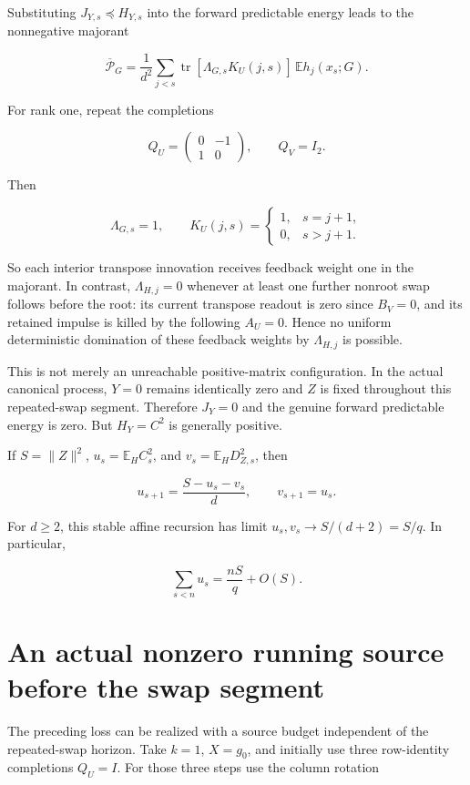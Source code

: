 \documentclass[11pt,oneside,openany,a4paper]{book}
\numberwithin{equation}{chapter}
\theoremstyle{definition}
\theoremstyle{remark}
\begin{document}
Substituting \(J_{Y,s}\preceq H_{Y,s}\) into the forward predictable energy leads to the nonnegative majorant

\[
\overline{\mathcal P}_G
=\frac1{d^2}\sum_{j<s}
\operatorname{tr}[\Lambda_{G,s}K_U(j,s)]\,
\mathbb E h_j(x_s;G).
\]

For rank one, repeat the completions

\[
Q_U=\begin{pmatrix}0&-1\\1&0\end{pmatrix},
\qquad Q_V=I_2.
\]

Then

\[
\Lambda_{G,s}=1,\qquad
K_U(j,s)=\begin{cases}1,&s=j+1,\\0,&s>j+1.\end{cases}
\]

So each interior transpose innovation receives feedback weight one in the majorant. In contrast, \(\Lambda_{H,j}=0\) whenever at least one further nonroot swap follows before the root: its current transpose readout is zero since \(B_V=0\), and its retained impulse is killed by the following \(A_U=0\). Hence no uniform deterministic domination of these feedback weights by \(\Lambda_{H,j}\) is possible.

This is not merely an unreachable positive-matrix configuration. In the actual canonical process, \(Y=0\) remains identically zero and \(Z\) is fixed throughout this repeated-swap segment. Therefore \(J_Y=0\) and the genuine forward predictable energy is zero. But \(H_Y=C^2\) is generally positive.

If \(S=\|Z\|^2\), \(u_s=\mathbb E_H C_s^2\), and \(v_s=\mathbb E_H D_{Z,s}^2\), then

\[
u_{s+1}=\frac{S-u_s-v_s}{d},\qquad v_{s+1}=u_s.
\]

For \(d\ge2\), this stable affine recursion has limit \(u_s,v_s\to S/(d+2)=S/q\). In particular,

\[
\sum_{s<n}u_s=\frac{nS}{q}+O(S).
\]

\section{An actual nonzero running source before the swap segment}\label{rowmajorant:an-actual-nonzero-running-source-before-the-swap-segment}

The preceding loss can be realized with a source budget independent of the repeated-swap horizon. Take \(k=1\), \(X=g_0\), and initially use three row-identity completions \(Q_U=I\). For those three steps use the column rotation
\end{document}
